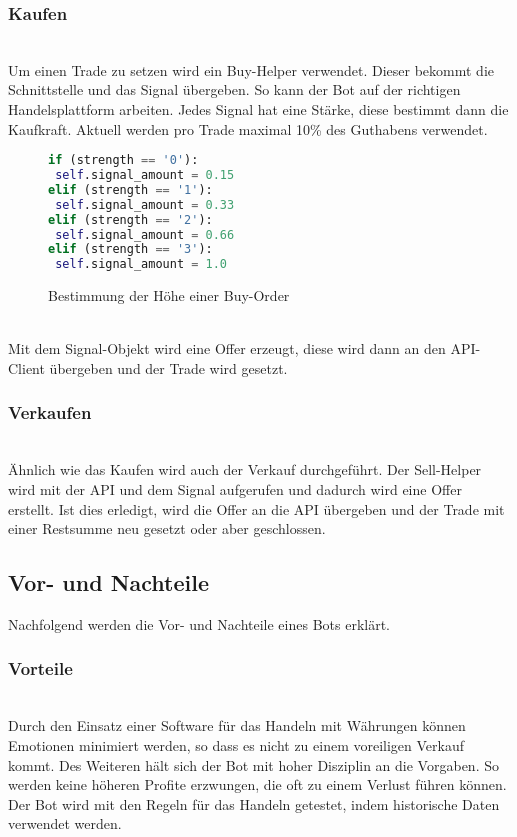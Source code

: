 \subsubsection{Kaufen\nopunct}~\\
Um einen Trade zu setzen wird ein Buy-Helper verwendet. Dieser bekommt die Schnittstelle und das Signal übergeben. So kann der Bot auf der richtigen Handelsplattform arbeiten. Jedes Signal hat eine Stärke, diese bestimmt dann die Kaufkraft. Aktuell werden pro Trade maximal 10\% des Guthabens verwendet. 
\begin{figure}[ht]
\begin{lstlisting}[language=Python]
if (strength == '0'):
 self.signal_amount = 0.15
elif (strength == '1'):
 self.signal_amount = 0.33
elif (strength == '2'):
 self.signal_amount = 0.66
elif (strength == '3'):
 self.signal_amount = 1.0
\end{lstlisting}
\caption{Bestimmung der Höhe einer Buy-Order}
\end{figure}
\\Mit dem Signal-Objekt wird eine Offer erzeugt, diese wird dann an den API-Client übergeben und der Trade wird gesetzt.
\subsubsection{Verkaufen\nopunct}~\\
Ähnlich wie das Kaufen wird auch der Verkauf durchgeführt. Der Sell-Helper wird mit der API und dem Signal aufgerufen und dadurch wird eine Offer erstellt. Ist dies erledigt, wird die Offer an die API übergeben und der Trade mit einer Restsumme neu gesetzt oder aber geschlossen.

\subsection{Vor- und Nachteile}
Nachfolgend werden die Vor- und Nachteile eines Bots erklärt.
\subsubsection{Vorteile\nopunct}~\\
Durch den Einsatz einer Software für das Handeln mit Währungen können Emotionen minimiert werden, so dass es nicht zu einem voreiligen Verkauf kommt. Des Weiteren hält sich der Bot mit hoher Disziplin an die Vorgaben. So werden keine höheren Profite erzwungen, die oft zu einem Verlust führen können. Der Bot wird mit den Regeln für das Handeln getestet, indem historische Daten verwendet werden.
